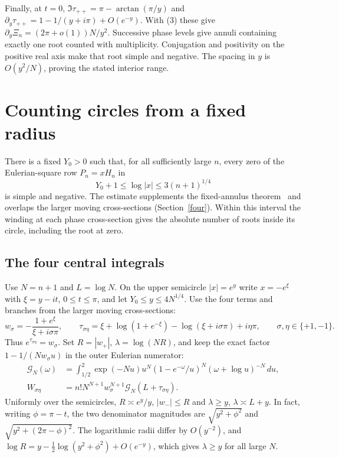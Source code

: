 \documentclass[11pt]{article}
\begin{document}
Finally, at $t=0$, $\Im\tau_{++}=\pi-\arctan(\pi/y)$ and $\partial_y\tau_{++}=1-1/(y+i\pi)+O(e^{-y})$. With (3) these give $\partial_y\Xi_n=(2\pi+o(1))N/y^2$. Successive phase levels give annuli containing exactly one root counted with multiplicity. Conjugation and positivity on the positive real axis make that root simple and negative. The spacing in $y$ is $O(y^2/N)$, proving the stated interior range.

\section{Counting circles from a fixed radius}\label{lower}
There is a fixed $Y_0>0$ such that, for all sufficiently large $n$, every zero of the Eulerian-square row $P_n=xH_n$ in
\[
 Y_0+1\le\log|x|\le3(n+1)^{1/4}
\]
is simple and negative. The estimate supplements the fixed-annulus theorem~\cite{disk} and overlaps the larger moving cross-sections (Section~\ref{four}). Within this interval the winding at each phase cross-section gives the absolute number of roots inside its circle, including the root at zero.

\subsection{The four central integrals}

Use $N=n+1$ and $L=\log N$. On the upper semicircle $|x|=e^y$ write $x=-e^\xi$ with $\xi=y-it$, $0\le t\le\pi$, and let $Y_0\le y\le4N^{1/4}$. Use the four terms and branches from the larger moving cross-sections:
\[
 w_\sigma=-\frac{1+e^\xi}{\xi+i\sigma\pi},\qquad
 \tau_{\sigma\eta}=\xi+\log(1+e^{-\xi})-\log(\xi+i\sigma\pi)+i\eta\pi ,
 \qquad \sigma,\eta\in\{+1,-1\}.
\]
Thus $e^{\tau_{\sigma\eta}}=w_\sigma$. Set $R=|w_+|$, $\lambda=\log(NR)$, and keep the exact factor $1-1/(Nw_\sigma u)$ in the outer Eulerian numerator:
\[
 \begin{aligned}
 \mathcal G_N(\omega)
 &=\int_{1/2}^2
 \exp(-Nu)u^N(1-e^{-\omega}/u)^N(\omega+\log u)^{-N}\,du,\\
 W_{\sigma\eta}
 &=n!N^{N+1}w_\sigma^{N+1}\mathcal G_N(L+\tau_{\sigma\eta}).
 \end{aligned}
 \tag{1}
\]
Uniformly over the semicircles, $R\asymp e^y/y$, $|w_-|\le R$ and $\lambda\ge y$, $\lambda\asymp L+y$. In fact, writing $\phi=\pi-t$, the two denominator magnitudes are $\sqrt{y^2+\phi^2}$ and $\sqrt{y^2+(2\pi-\phi)^2}$. The logarithmic radii differ by $O(y^{-2})$, and $\log R=y-\tfrac12\log(y^2+\phi^2)+O(e^{-y})$, which gives $\lambda\ge y$ for all large $N$.
\end{document}

